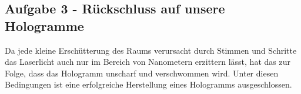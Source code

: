 \subsection*{Aufgabe 3 - Rückschluss auf unsere Hologramme}
Da jede kleine Erschütterung des Raums verursacht durch Stimmen und Schritte das Laserlicht auch nur im Bereich von Nanometern erzittern lässt, hat das zur Folge, dass das Hologramm unscharf und verschwommen wird. Unter diesen Bedingungen ist eine erfolgreiche Herstellung eines Hologramms ausgeschlossen.